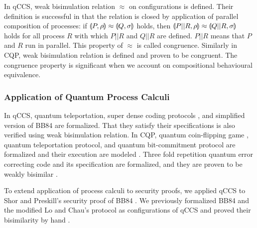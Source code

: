 In qCCS, weak bisimulation relation $\approx$
on configurations is defined.
Their definition is successful in that 
the relation is closed by application of parallel composition
of processes: if $\llparenthesis P, \rho \rrparenthesis \approx \llparenthesis Q, \sigma \rrparenthesis$ holds,
then $\llparenthesis P||R, \rho \rrparenthesis \approx \llparenthesis Q||R, \sigma \rrparenthesis$ holds for all
process $R$ with which $P||R$ and $Q||R$ are defined.
$P||R$ means that $P$ and $R$ run in parallel.
This property of $\approx$ is called congruence.
Similarly in CQP, weak bisimulation relation is defined and proven to
be congruent. The congruence property is significant when we account on 
compositional behavioural equivalence.

\subsubsection{Application of Quantum Process Calculi}
In qCCS, quantum teleportation, super dense coding protocols
\cite{FengDuanYing2011}, and simplified version of BB84
\cite{DengFeng2012} are formalized. That they satisfy their
specifications is also verified using weak bisimulation relation.
In CQP, quantum coin-flipping game \cite{Meyer1999},
quantum teleportation protocol,
and quantum bit-commitment protocol
are formalized and their execution
are modeled \cite{NagarajanPapanikolaouBowenGay2005}.
Three fold repetition quantum error correcting code and
its specification are formalized, and they are proven to
be weakly bisimilar \cite{Davidson-etal2012}.

To extend application of process calculi to security proofs, we
applied qCCS to Shor and Preskill's
security proof of BB84 \cite{ShorPreskill2000}.
We previously formalized BB84 and the modified Lo and Chau's protocol
as configurations of qCCS and proved their bisimilarity by hand
\cite{Kubota2012}.

